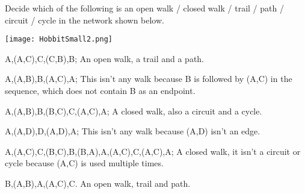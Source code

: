 

Decide which of the following is an open walk / closed walk / trail / path / circuit / cycle in the network shown below.
\begin{center}
\texttt{[image: HobbitSmall2.png]}
\end{center}

\subquestion A,(A,C),C,(C,B),B;
\solution
An open walk, a trail and a path. 

\subquestion A,(A,B),B,(A,C),A; 
\solution
This isn't any walk because B is followed by (A,C) in the sequence, which does not contain B as an endpoint. 

\subquestion 
A,(A,B),B,(B,C),C,(A,C),A; 
\solution
A closed walk, also a circuit and a cycle. 
 
\subquestion 
A,(A,D),D,(A,D),A; 
\solution
This isn't any walk because (A,D) isn't an edge.

\subquestion 
A,(A,C),C,(B,C),B,(B,A),A,(A,C),C,(A,C),A; 
\solution
A closed walk, it isn't a circuit or cycle because (A,C) is used multiple times. 

\subquestion 
B,(A,B),A,(A,C),C.
\solution
An open walk, trail and path.
\solutionend


